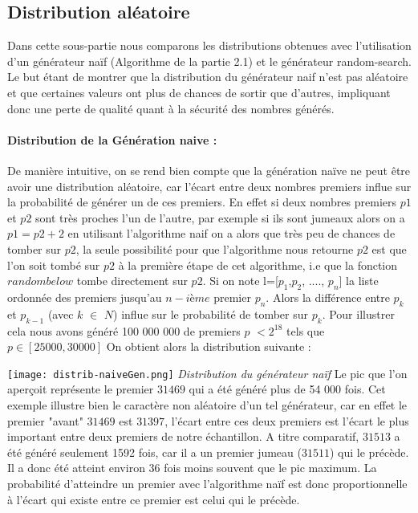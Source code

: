 \documentclass[a4paper,11pt]{article}
\begin{document}
\subsection{Distribution aléatoire}
Dans cette sous-partie nous comparons les distributions obtenues avec l'utilisation d'un générateur naïf (Algorithme de la partie 2.1) et le générateur random-search. Le but étant de montrer que la distribution du générateur naif n'est pas aléatoire et que certaines valeurs ont plus de chances de sortir que d'autres, impliquant donc une perte de qualité quant à la sécurité des nombres générés. 

\paragraph{Distribution de la Génération naive : }
De manière intuitive, on se rend bien compte que la génération naïve ne peut être avoir une distribution aléatoire, car l'écart entre deux nombres premiers influe sur la probabilité de générer un de ces premiers. En effet si deux nombres premiers $p1$ et $p2$ sont très proches l'un de l'autre, par exemple si ils sont jumeaux alors on a  $p1=p2+2$ en utilisant l'algorithme naif on a alors que très peu de chances de tomber sur $p2$, la seule possibilité pour que l'algorithme nous retourne $p2$ est que l'on soit tombé sur $p2$ à la première étape de cet algorithme, i.e que la fonction $randombelow$ tombe directement sur $p2$. \newline Si on note l=[$p_{1}$,$p_{2}$, ...., $p_{n}$] la liste ordonnée des premiers jusqu'au $n-ième$ premier $p_{n}$. Alors la différence entre $p_{k}$ et $p_{k-1}$ (avec $k$ $\in$ $N$) influe sur le probabilité de tomber sur $p_{k}$. Pour illustrer cela nous avons généré 100 000 000 de premiers $p$ $< 2^{18} $ tels que $p \in [25 000, 30 000]$ 
On obtient alors la distribution suivante : 

{\centering 
\texttt{[image: distrib-naiveGen.png]}
\hspace*{40mm}\emph{Distribution du générateur naïf}
}\newline
\smallbreak
Le pic que l'on aperçoit représente le premier $31469$ qui a été généré plus de 54 000 fois. Cet exemple illustre bien le caractère non aléatoire d'un tel générateur, car en effet le premier "avant" $31469$ est $31397$, l'écart entre ces deux premiers est l'écart le plus important entre deux premiers de notre échantillon. A titre comparatif, $31513$ a été généré seulement 1592 fois, car il a un premier jumeau ($31511$) qui le précède. Il a donc été atteint environ 36 fois moins souvent que le pic maximum.
La probabilité d'atteindre un premier avec l'algorithme naïf est donc proportionnelle à l'écart qui existe entre ce premier est celui qui le précède. 
\end{document}
